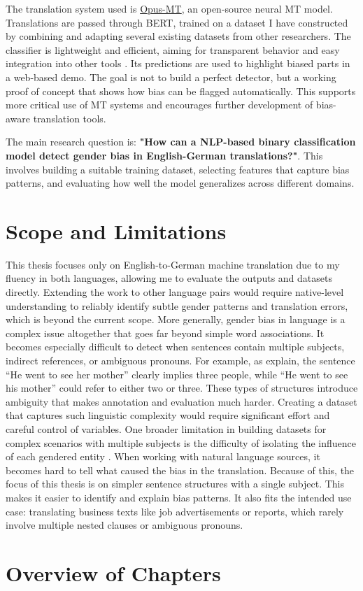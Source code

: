 The translation system used is \href{https://github.com/Helsinki-NLP/Opus-MT?tab=readme-ov-file}{Opus-MT}, an open-source neural MT model. %
Translations are passed through BERT, trained on a dataset I have constructed by combining and adapting several existing datasets from other researchers. The classifier is lightweight and efficient, aiming for transparent behavior and easy integration into other tools \citep{devlinBERTPretrainingDeep2019}. Its predictions are used to highlight biased parts in a web-based demo. The goal is not to build a perfect detector, but a working proof of concept that shows how bias can be flagged automatically. This supports more critical use of MT systems and encourages further development of bias-aware translation tools.

The main research question is: \textbf{"How can a NLP-based binary classification model detect gender bias in English-German translations?"}. This involves building a suitable training dataset, selecting features that capture bias patterns, and evaluating how well the model generalizes across different domains.

\section{Scope and Limitations}

This thesis focuses only on English-to-German machine translation due to my fluency in both languages, allowing me to evaluate the outputs and datasets directly. Extending the work to other language pairs would require native-level understanding to reliably identify subtle gender patterns and translation errors, which is beyond the current scope. More generally, gender bias in language is a complex issue altogether that goes far beyond simple word associations. It becomes especially difficult to detect when sentences contain multiple subjects, indirect references, or ambiguous pronouns. For example, as \citet{barclayInvestigatingMarkersDrivers2024a} explain, the sentence “He went to see her mother” clearly implies three people, while “He went to see his mother” could refer to either two or three. These types of structures introduce ambiguity that makes annotation and evaluation much harder. Creating a dataset that captures such linguistic complexity would require significant effort and careful control of variables. One broader limitation in building datasets for complex scenarios with multiple subjects is the difficulty of isolating the influence of each gendered entity \citep{lardelliBuildingBridgesDataset2024}. When working with natural language sources, it becomes hard to tell what caused the bias in the translation. Because of this, the focus of this thesis is on simpler sentence structures with a single subject. This makes it easier to identify and explain bias patterns. It also fits the intended use case: translating business texts like job advertisements or reports, which rarely involve multiple nested clauses or ambiguous pronouns.
 
\section{Overview of Chapters}
